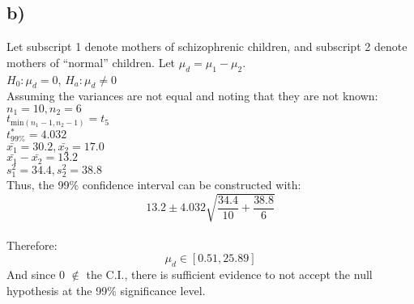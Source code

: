 \documentclass[]{article}
\begin{document}
\subsection{b)}
Let subscript 1 denote mothers of schizophrenic children, and subscript 2 denote mothers of ``normal'' children. Let $\mu_d = \mu_1 - \mu_2$.
\\
$H_0: \mu_d = 0$, $H_a: \mu_d \neq 0$
\\
Assuming the variances are not equal and noting that they are not known:
\\
$n_1 = 10, n_2 = 6$
\\
$t_{\textrm{min}(n_1-1, n_2-1)} = t_5$
\\
$t^*_{99\%} = 4.032$
\\
$\bar{x_1} = 30.2, \bar{x_2} = 17.0$
\\
$\bar{x_1} - \bar{x_2} = 13.2$
\\
$s^2_1 = 34.4, s^2_2 = 38.8$
\\
Thus, the 99\% confidence interval can be constructed with:
$$13.2 \pm 4.032 \sqrt{\frac{34.4}{10}+\frac{38.8}{6}}$$
\\
Therefore:
$$\mu_d \in [0.51,25.89]$$
And since 0 $\notin$ the C.I., there is sufficient evidence to not accept the null hypothesis at the 99\% significance level.
\end{document}

